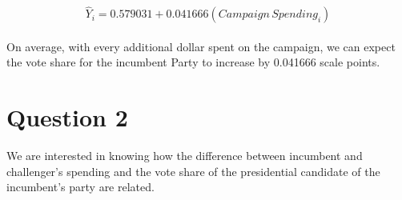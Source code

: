 \documentclass[12pt,letterpaper]{article}
\begin{document}
{ 			$$\hat{Y}_i = 0.579031 +  0.041666 (Campaign \, Spending_i) $$ } \\

\noindent On average, with every additional dollar spent on the campaign, we can expect the vote share for the incumbent Party to increase by 0.041666 scale points. \\


	\newpage
	
	
\section*{Question 2}
\noindent We are interested in knowing how the difference between incumbent and challenger's spending and the vote share of the presidential candidate of the incumbent's party are related.	\vspace{.25cm}
\end{document}
